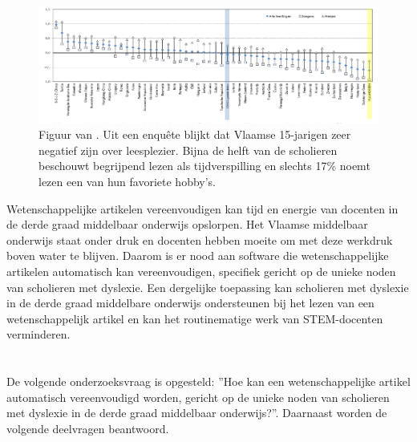 \begin{figure}[H]
	\begin{center}
		\includegraphics[width=\linewidth]{img/oeso-graphic-leesplezier.png}
	\end{center}
	\caption{Figuur van \textcite{DeMeyer2019}. Uit een enquête blijkt dat Vlaamse 15-jarigen zeer negatief zijn over leesplezier. Bijna de helft van de scholieren beschouwt begrijpend lezen als tijdverspilling en slechts 17\% noemt lezen een van hun favoriete hobby's. }
\end{figure}

Wetenschappelijke artikelen vereenvoudigen kan tijd en energie van docenten in de derde graad middelbaar onderwijs opslorpen. Het Vlaamse middelbaar onderwijs staat onder druk en docenten hebben moeite om met deze werkdruk boven water te blijven. Daarom is er nood aan software die wetenschappelijke artikelen automatisch kan vereenvoudigen, specifiek gericht op de unieke noden van scholieren met dyslexie. Een dergelijke toepassing kan scholieren met dyslexie in de derde graad middelbare onderwijs ondersteunen bij het lezen van een wetenschappelijk artikel en kan het routinematige werk van STEM-docenten verminderen. 

\section{}%
\label{sec:onderzoeksvraag}

De volgende onderzoeksvraag is opgesteld: ”Hoe kan een wetenschappelijke artikel automatisch vereenvoudigd worden, gericht op de unieke noden van scholieren met dyslexie in de derde graad middelbaar onderwijs?”. Daarnaast worden de volgende deelvragen beantwoord.

